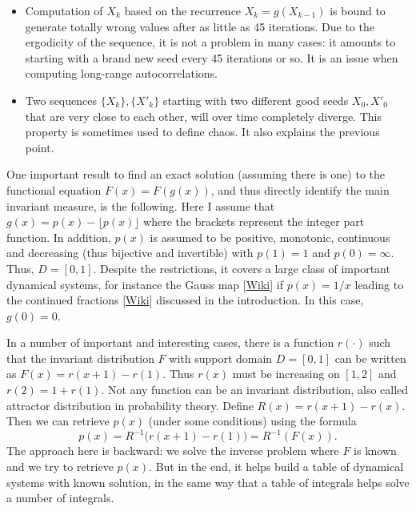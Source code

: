 \documentclass[oneside,10pt]{book}
\begin{document}
\begin{itemize}
\item Computation of $X_k$ based on the recurrence $X_k=g(X_{k-1})$  is bound to generate totally wrong values after as little as 45 iterations. Due to the \textcolor{index}{ergodicity} of the sequence, it is not a problem in many cases: it amounts to starting with a brand new seed every 45 iterations or so. It is an issue when computing long-range autocorrelations.
\item Two sequences $\{X_k\}, \{X'_k\}$ starting with two different good seeds $X_0, X'_0$ that are very close to each other, will over time completely diverge. This property is sometimes used to define chaos. It also explains the previous point.
\end{itemize} \vspace{1ex}

\noindent One important result to find an exact solution (assuming there is one) to the functional equation $F(x) = F(g(x))$, and thus directly identify the main invariant measure, is the following. Here I assume that $g(x) = p(x) - \lfloor p(x)\rfloor$ where the brackets represent the integer part function. In addition, $p(x)$ is assumed to be positive, monotonic, continuous and decreasing (thus bijective and invertible) with $p(1)=1$ and $p(0)=\infty$. Thus, $D = [0, 1]$. Despite the restrictions, it covers a large class of important dynamical systems, for instance
 the \textcolor{index}{Gauss map} [\href{https://en.wikipedia.org/wiki/Gauss\%E2\%80\%93Kuzmin\%E2\%80\%93Wirsing_operator}{Wiki}] if $p(x) = 1/x$  leading to the \textcolor{index}{continued fractions} [\href{https://en.wikipedia.org/wiki/Continued_fraction}{Wiki}] discussed in the introduction. In this case, $g(0)=0$.

In a number of important and interesting cases, there is a function $r(\cdot)$ such that the \textcolor{index}{invariant distribution} $F$ with support domain
 $D=[0, 1]$ can be written as $F(x)=r(x+1)-r(1)$.  Thus $r(x)$ must be increasing on $[1,2]$ and $r(2)=1+r(1)$. Not any function can be an invariant distribution, also called
\textcolor{index}{attractor distribution} in probability theory. Define $R(x)=r(x+1)-r(x)$. Then we can retrieve $p(x)$ (under some conditions) using the formula
\begin{equation}
p(x)=R^{-1}\Big(r(x+1)-r(1)\Big)=R^{-1}(F(x)). \label{ch2eq1}
\end{equation}
The approach here is backward: we solve the inverse problem where $F$ is known and we try to retrieve $p(x)$. But in the end, it helps build a table of dynamical systems with known solution, in the same way that a table of integrals helps solve a number of integrals.
\end{document}
